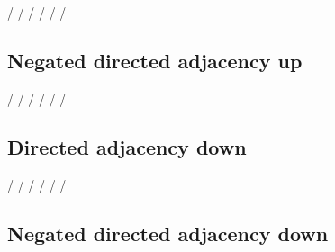 \documentclass{article}
\begin{document}
\GTStestText{\GTSxa[m,u]}{\GTSxa[m,u,r]}


\GTStestEqualTextsI{\GTSdAUM/}{\GTSdAUMR/}%
{\GTSdirectedAdjacencyUpMonochrome/}%
{\GTSdirectedAdjacencyUpMonochromeRelation/}
\GTStestEqualTextsI{\GTSdAUM/}{\GTSdAUMR/}%
{\GTSdirAdjUpMon/}%
{\GTSdirAdjUpMonRel/}
\GTStestEqualTextsI{\GTSdAUM/}{\GTSdAUMR/}%
{\GTSdirAdjUpMono/}%
{\GTSdirAdjUpMonoRel/}

\subsection{Negated directed adjacency up}

\GTStestText{\GTSnDAUM/}{\GTSnDAUMR/}

\GTStestText{\GTSxa[m,n,u]}{\GTSxa[m,n,u,r]}


\GTStestEqualTextsI{\GTSnDAUM/}{\GTSnDAUMR/}%
{\GTSnegatedDirectedAdjacencyUpMonochrome/}%
{\GTSnegatedDirectedAdjacencyUpMonochromeRelation/}
\GTStestEqualTextsI{\GTSnDAUM/}{\GTSnDAUMR/}%
{\GTSnegDirAdjUpMono/}%
{\GTSnegDirAdjUpMonoRel/}
\GTStestEqualTextsI{\GTSnDAUM/}{\GTSnDAUMR/}%
{\GTSnegDirAdjUpMon/}%
{\GTSnegDirAdjUpMonRel/}

\subsection{Directed adjacency down}

\GTStestText{\GTSdADM/}{\GTSdADMR/}

\GTStestText{\GTSxa[m,d]}{\GTSxa[m,d,r]}


\GTStestEqualTextsI{\GTSdADM/}{\GTSdADMR/}%
{\GTSdirectedAdjacencyDownMonochrome/}%
{\GTSdirectedAdjacencyDownMonochromeRelation/}
\GTStestEqualTextsI{\GTSdADM/}{\GTSdADMR/}%
{\GTSdirAdjDownMono/}%
{\GTSdirAdjDownMonoRel/}
\GTStestEqualTextsI{\GTSdADM/}{\GTSdADMR/}%
{\GTSdirAdjDownMon/}%
{\GTSdirAdjDownMonRel/}

\subsection{Negated directed adjacency down}

\GTStestText{\GTSnDADM/}{\GTSnDADMR/}

\GTStestText{\GTSxa[m,n,d]}{\GTSxa[m,n,d,r]}
\end{document}
